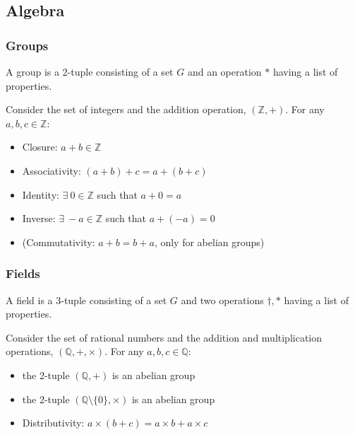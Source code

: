 \documentclass{beamer}
\begin{document}
\subsection{Algebra}

\begin{frame}
\frametitle{Groups}
A group is a 2-tuple consisting of a set $G$ and an operation $*$ having a list of properties.

Consider the set of integers and the addition operation, $(\mathbb Z,+)$.  For any $a,b,c \in \mathbb Z$:
\begin{itemize}
  \item Closure: $a + b \in \mathbb Z$
  \item Associativity: $(a + b) + c = a + (b + c)$
  \item Identity: $\exists\ 0 \in \mathbb Z$ such that $a + 0 = a$
  \item Inverse: $\exists\ -a \in \mathbb Z$ such that $a + (-a) = 0$
  \item (Commutativity: $a + b = b + a$, only for abelian groups)
\end{itemize}
\end{frame}

\begin{frame}
\frametitle{Fields}
A field is a 3-tuple consisting of a set $G$ and two operations $\dag,*$ having a list of properties.

Consider the set of rational numbers and the addition and multiplication operations, $(\mathbb Q,+,\times)$.  For any $a,b,c \in \mathbb Q$:
\begin{itemize}
  \item the 2-tuple $(\mathbb Q,+)$ is an abelian group
  \item the 2-tuple $(\mathbb Q \setminus \{0\},\times)$ is an abelian group
  \item Distributivity: $a\times(b + c) = a\times b + a\times c$
\end{itemize}
\end{frame}
\end{document}
